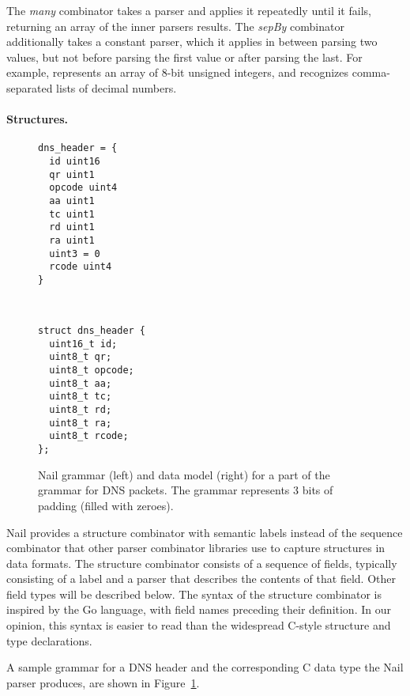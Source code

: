 The \emph{many} combinator takes a parser and applies it repeatedly
until it fails, returning an array of the inner parsers results. The
\emph{sepBy} combinator
additionally takes a constant parser, which it applies in between parsing
two values, but not before parsing the first value or after parsing the
last.
For example,  represents an array of 8-bit unsigned
integers, and  recognizes
comma-separated lists of decimal numbers.

\paragraph{Structures.}

\begin{figure}[tb]
\smaller[0.5]
\begin{minipage}{0.45\columnwidth}
\begin{verbatim}
dns_header = {
  id uint16
  qr uint1
  opcode uint4
  aa uint1 
  tc uint1
  rd uint1
  ra uint1
  uint3 = 0
  rcode uint4
}
\end{verbatim} 
\end{minipage}
~
\begin{minipage}{0.45\columnwidth}
\begin{verbatim}
struct dns_header {
  uint16_t id;
  uint8_t qr;
  uint8_t opcode;
  uint8_t aa;
  uint8_t tc;
  uint8_t rd;
  uint8_t ra;
  uint8_t rcode;
};
\end{verbatim} 
\end{minipage}

\caption{Nail grammar (left) and data model (right) for a part of the
grammar for DNS packets.  The  grammar represents
3 bits of padding (filled with zeroes).}
\label{fig:dns-struct}
\end{figure}


Nail provides a structure combinator with semantic labels instead of the sequence combinator that
other parser combinator libraries use to capture structures in data formats. 
The structure combinator consists of a sequence of fields, typically consisting of a label and a
parser that describes the contents of that field. Other field types will be described below.
 The syntax of the structure combinator is inspired by the Go language\cite{golang}, with field names preceding their definition.
In our opinion, this syntax is easier to read than the widespread C-style structure and type
declarations.

A sample grammar for a DNS header and the corresponding C data type the Nail parser produces, are
shown in Figure~\ref{fig:dns-struct}.


